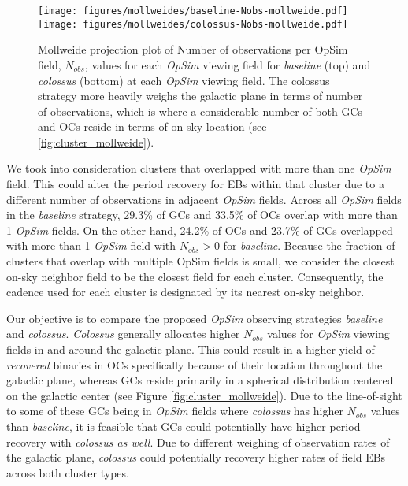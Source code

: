 \documentclass[twocolumn]{aastex63}
\begin{document}
\begin{figure}
    \centering
        \texttt{[image: figures/mollweides/baseline-Nobs-mollweide.pdf]}
        \texttt{[image: figures/mollweides/colossus-Nobs-mollweide.pdf]}
        
        \caption{Mollweide projection plot of Number of observations per OpSim field, $N_{obs}$, values for each \textit{OpSim} viewing field for \textit{baseline} (top) and \textit{colossus} (bottom) at each \textit{OpSim} viewing field. The colossus strategy more heavily weighs the galactic plane in terms of number of observations, which is where a considerable number of both GCs and OCs reside in terms of on-sky location (see \ref{fig:cluster_mollweide}).}
        \label{fig:colossus_mollweide}
        \label{fig:baseline_mollweide}

\end{figure}

We took into consideration clusters that overlapped with more than one \textit{OpSim} field. This could alter the period recovery for EBs within that cluster due to a different number of observations in adjacent \textit{OpSim} fields. Across all \textit{OpSim} fields in the \textit{baseline} strategy, 29.3\% of GCs and 33.5\% of OCs overlap with more than 1 \textit{OpSim} fields. On the other hand, 24.2\% of OCs and 23.7\% of GCs overlapped with more than 1 \textit{OpSim} field with $N_{obs} > 0$ for \textit{baseline}. Because the fraction of clusters that overlap with multiple OpSim fields is small, we consider the closest on-sky neighbor field to be the closest field for each cluster. Consequently, the cadence used for each cluster is designated by its nearest on-sky neighbor.

Our objective is to compare the proposed \textit{OpSim} observing strategies \textit{baseline} and \textit{colossus}. \textit{Colossus} generally allocates higher $N_{obs}$ values for \textit{OpSim} viewing fields in and around the galactic plane. This could result in a higher yield of \textit{recovered} binaries in OCs specifically because of their location throughout the galactic plane, whereas GCs reside primarily in a spherical distribution centered on the galactic center (see Figure \ref{fig:cluster_mollweide}). Due to the line-of-sight to some of these GCs being in \textit{OpSim} fields where \textit{colossus} has higher $N_{obs}$ values than \textit{baseline}, it is feasible that GCs could potentially have higher period recovery with \textit{colossus as well}. Due to different weighing of observation rates of the galactic plane, \textit{colossus} could potentially recovery higher rates of field EBs across both cluster types.
\end{document}
